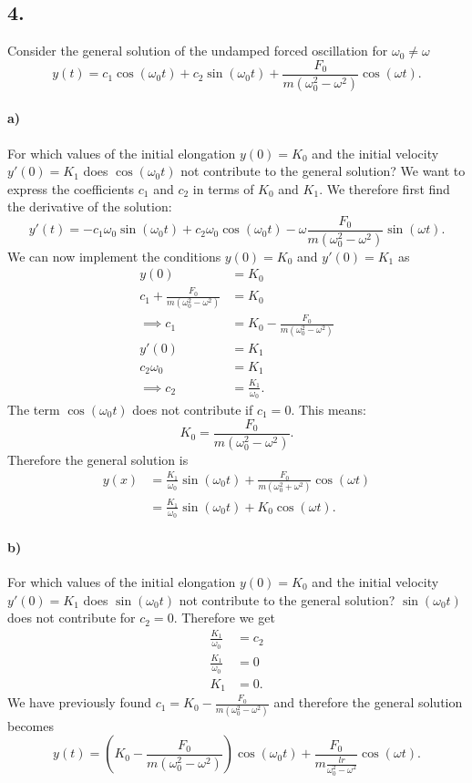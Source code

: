 \subsection*{4.} Consider the general solution of the undamped forced oscillation for $\omega_0 \neq \omega$
\[ 
y(t) = c_1 \cos(\omega_0 t) + c_2 \sin (\omega_0 t) + \frac{F_0}{m (\omega_0^2 - \omega^2)} \cos (\omega t)
.\]

\paragraph{a)} For which values of the initial elongation $y(0) = K_0$ and the initial velocity $y'(0) = K_1$ does $\cos(\omega_0 t)$ not contribute to the general solution? 
\bigbreak
We want to express the coefficients $c_1$ and $c_2$ in terms of $K_0$ and $K_1$. We therefore first find the derivative of the solution:
\[ 
y'(t) = - c_1 \omega_0 \sin (\omega_0 t) + c_2 \omega_0 \cos (\omega_0 t) - \omega \frac{F_0}{m \left( \omega_0^2 - \omega^2 \right)} \sin (\omega t)
.\]
We can now implement the conditions $y(0) = K_0$ and $y'(0) = K_1$ as
\begin{align*}
  y(0) &= K_0 \\
  c_1 + \frac{F_0}{m \left( \omega_0^2 - \omega^2 \right)} &= K_0 \\
  \implies c_1 &= K_0 - \frac{F_0}{m \left( \omega_0^2 - \omega^2 \right)} \\
  y'(0) &= K_1 \\
  c_2 \omega_0 &= K_1 \\
  \implies c_2 &= \frac{K_1}{\omega_0}
.\end{align*}
The term $\cos (\omega_0 t)$ does not contribute if $c_1 = 0$. This means:
\[
  K_0 = \frac{F_0}{m \left( \omega_0^2 - \omega^2 \right)}
.\]
Therefore the general solution is
\begin{align*}
  y(x) &= \frac{K_1}{\omega_0} \sin(\omega_0 t) + \frac{F_0}{m \left( \omega_0^2 + \omega^2 \right)} \cos(\omega t) \\
  &= \frac{K_1}{\omega_0} \sin(\omega_0 t) + K_0 \cos(\omega t)
.\end{align*}


\paragraph{b)} For which values of the initial elongation $y(0) = K_0$ and the initial velocity $y'(0) = K_1$ does $\sin(\omega_0 t)$ not contribute to the general solution? 
\bigbreak
$\sin (\omega_0 t)$ does not contribute for $c_2 = 0$. Therefore we get
\begin{align*}
  \frac{K_1}{\omega_0} &= c_2 \\
  \frac{K_1}{\omega_0} &= 0 \\
  K_1 &= 0
.\end{align*}
We have previously found $c_1 = K_0 - \frac{F_0}{m \left( \omega_0^2 - \omega^2 \right)}$ and therefore the general solution becomes
\[ 
y(t) = \left( K_0 - \frac{F_0}{m \left( \omega_0^2 - \omega^2 \right)} \right) \cos (\omega_0 t) + \frac{F_0}{m \frac{lr}{\omega_0^2 - \omega^2}} \cos (\omega t)
.\]

